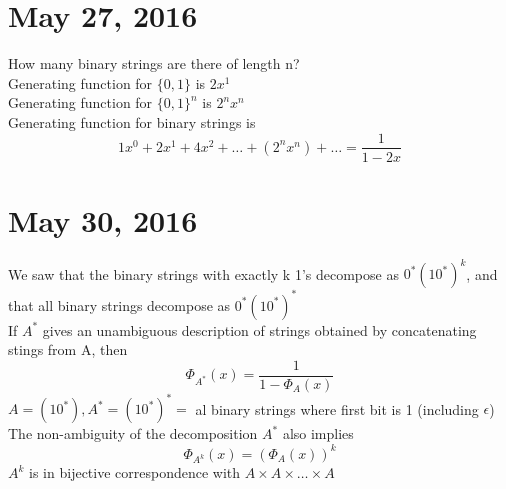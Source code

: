 \documentclass{article}
\begin{document}
\section*{May 27, 2016}
How many binary strings are there of length n?\\
Generating function for $\{0,1\}$ is $2x^1$\\
Generating function for $\{0,1\}^n$ is $2^nx^n$\\
Generating function for binary strings is $$1x^0+2x^1+4x^2+\hdots+(2^nx^n)+\hdots=\frac{1}{1-2x}$$

\section*{May 30, 2016}
We saw that the binary strings with exactly k 1's decompose as $0^*(10^*)^k$, and that all binary strings decompose as $0^*(10^*)^*$\\
If $A^*$
 gives an unambiguous description of strings obtained by concatenating stings from A, then $$\Phi_{A^*}(x)=\frac{1}{1-\Phi_{A}(x)}$$
 $A=(10^*),A^*=(10^*)^*=$ al binary strings where first bit is 1 (including $\epsilon$)\\
 The non-ambiguity of the decomposition $A^*$ also implies $$\Phi_{A^k}(x)=(\Phi_{A}(x))^k$$
$A^k$ is in bijective correspondence with $A \times A \times \hdots \times A$
\end{document}
